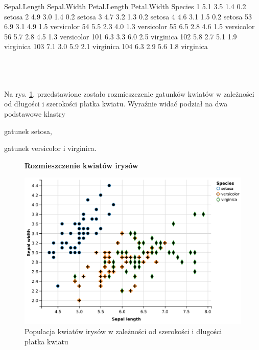 \begin{code}[caption=Przykład danych o kwiatach irysów, label={lst:danekwiatow}, captionpos=b, 
belowcaptionskip=4pt]
    Sepal.Length Sepal.Width Petal.Length Petal.Width    Species
1            5.1         3.5          1.4         0.2     setosa
2            4.9         3.0          1.4         0.2     setosa
3            4.7         3.2          1.3         0.2     setosa
4            4.6         3.1          1.5         0.2     setosa
53           6.9         3.1          4.9         1.5 versicolor
54           5.5         2.3          4.0         1.3 versicolor
55           6.5         2.8          4.6         1.5 versicolor
56           5.7         2.8          4.5         1.3 versicolor
101          6.3         3.3          6.0         2.5  virginica
102          5.8         2.7          5.1         1.9  virginica
103          7.1         3.0          5.9         2.1  virginica
104          6.3         2.9          5.6         1.8  virginica
\end{code}
\\\\\\
Na rys. \ref{fig:plotsepalwidthsepallength}, przedstawione zostało rozmieszczenie gatunków kwiatów w zależności od 
długości i szerokości płatka kwiatu. Wyraźnie widać podział na dwa podstawowe klastry
\begin{itemize*} 
\renewcommand{\labelitemi}{$\bullet$}
 \item gatunek setosa,
 \item gatunek versicolor i virginica.
\end{itemize*}

\begin{figure}[h]
    \centering
    \textbf{Rozmieszczenie kwiatów irysów}\par\medskip
    \includegraphics[scale=0.5]{plotsepalwidthsepallength}
    \caption{Populacja kwiatów irysów w zależności od szerokości i długości płatka kwiatu}
    \label{fig:plotsepalwidthsepallength}
\end{figure}


